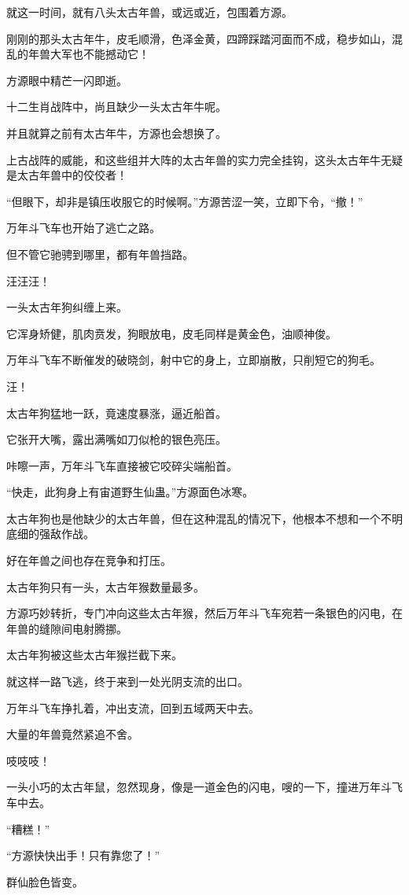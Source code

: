 \begin{this_body}
就这一时间，就有八头太古年兽，或远或近，包围着方源。

刚刚的那头太古年牛，皮毛顺滑，色泽金黄，四蹄踩踏河面而不成，稳步如山，混乱的年兽大军也不能撼动它！

方源眼中精芒一闪即逝。

十二生肖战阵中，尚且缺少一头太古年牛呢。

并且就算之前有太古年牛，方源也会想换了。

上古战阵的威能，和这些组并大阵的太古年兽的实力完全挂钩，这头太古年牛无疑是太古年兽中的佼佼者！

“但眼下，却非是镇压收服它的时候啊。”方源苦涩一笑，立即下令，“撤！”

万年斗飞车也开始了逃亡之路。

但不管它驰骋到哪里，都有年兽挡路。

汪汪汪！

一头太古年狗纠缠上来。

它浑身矫健，肌肉贲发，狗眼放电，皮毛同样是黄金色，油顺神俊。

万年斗飞车不断催发的破晓剑，射中它的身上，立即崩散，只削短它的狗毛。

汪！

太古年狗猛地一跃，竟速度暴涨，逼近船首。

它张开大嘴，露出满嘴如刀似枪的银色亮压。

咔嚓一声，万年斗飞车直接被它咬碎尖端船首。

“快走，此狗身上有宙道野生仙蛊。”方源面色冰寒。

太古年狗也是他缺少的太古年兽，但在这种混乱的情况下，他根本不想和一个不明底细的强敌作战。

好在年兽之间也存在竞争和打压。

太古年狗只有一头，太古年猴数量最多。

方源巧妙转折，专门冲向这些太古年猴，然后万年斗飞车宛若一条银色的闪电，在年兽的缝隙间电射腾挪。

太古年狗被这些太古年猴拦截下来。

就这样一路飞逃，终于来到一处光阴支流的出口。

万年斗飞车挣扎着，冲出支流，回到五域两天中去。

大量的年兽竟然紧追不舍。

吱吱吱！

一头小巧的太古年鼠，忽然现身，像是一道金色的闪电，嗖的一下，撞进万年斗飞车中去。

“糟糕！”

“方源快快出手！只有靠您了！”

群仙脸色皆变。


\end{this_body}
